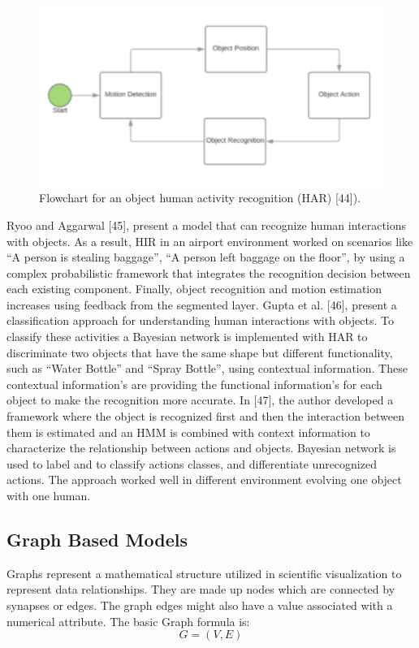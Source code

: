 \begin{figure}[ht]
\centering
\includegraphics{Figures/ht1}
\decoRule
\caption[Flowchart for an object human activity recognition (HAR) "44"]{Flowchart for an object human activity recognition (HAR) [44]).}
\label{fig:la}
\end{figure}
Ryoo and Aggarwal [45], present a model that can recognize human interactions with objects. As a result, HIR in an airport environment worked on scenarios like “A person is stealing baggage”, “A person left baggage on the floor”, by using a complex probabilistic framework that integrates the recognition decision between each existing component. Finally, object recognition and motion estimation increases using feedback from the segmented layer. Gupta et al. [46], present a classification approach for understanding human interactions with objects. To classify these activities a Bayesian network is implemented with HAR to discriminate two objects that have the same shape but different functionality, such as “Water Bottle” and “Spray Bottle”, using contextual information. These contextual information’s are providing the functional information’s for each object to make the recognition more accurate. In [47], the author developed a framework where the object is recognized first and then the interaction between them is estimated and an HMM is combined with context information to characterize the relationship between actions and objects. Bayesian network is used to label and to classify actions classes, and differentiate unrecognized actions. The approach worked well in different environment evolving one object with one human.

\subsection{Graph Based Models}
\hspace{5mm} Graphs represent a mathematical structure utilized in scientific visualization to represent data relationships. They are made up nodes which are connected by synapses or edges. The graph edges might also have a value associated with a numerical attribute.  
The basic Graph formula is:
\begin{equation}
    G = (V, E)
\end{equation}


